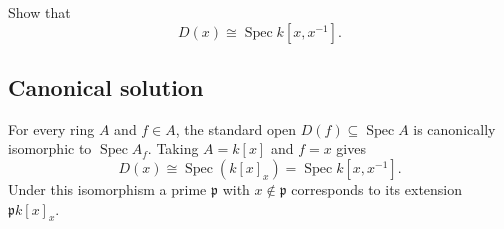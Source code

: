 
\begin{exercise}
	Show that
	\[
	D(x)\cong \operatorname{Spec} k[x,x^{-1}].
	\]
\end{exercise}

\subsection*{Canonical solution}
For every ring $A$ and $f\in A$, the standard open $D(f)\subseteq\operatorname{Spec} A$ is canonically isomorphic to $\operatorname{Spec} A_f$. Taking $A=k[x]$ and $f=x$ gives
\[
D(x)\cong\operatorname{Spec}(k[x]_x)=\operatorname{Spec} k[x,x^{-1}].
\]
Under this isomorphism a prime $\mathfrak p$ with $x\notin\mathfrak p$ corresponds to its extension $\mathfrak p k[x]_x$.
